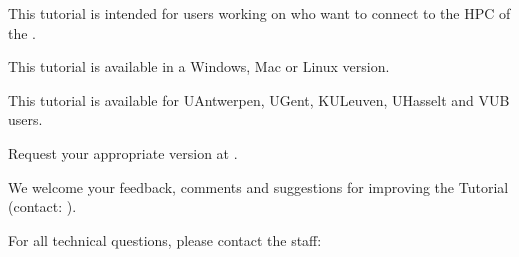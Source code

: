 This tutorial \strong{(\version)} is intended for users working on \strong{\OS} who want to connect to the HPC of the \strong{\university}.

This tutorial is available in a Windows, Mac or Linux version.

This tutorial is available for UAntwerpen, UGent, KULeuven, UHasselt and VUB users.

Request your appropriate version at \hpcinfo.


We welcome your feedback, comments and suggestions for improving the \hpc
Tutorial  (contact: \hpcinfo).

For all technical questions, please contact the \hpc staff:


